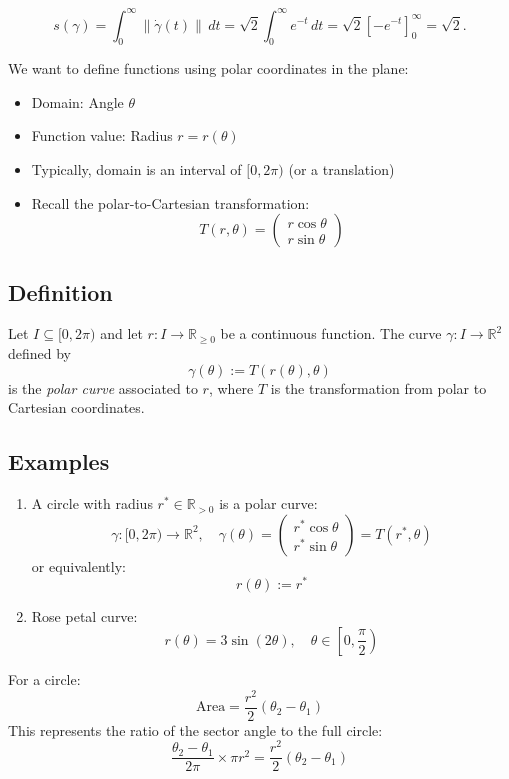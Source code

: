 \documentclass{article}
\begin{document}
\[ s(\gamma) = \int_0^\infty \|\dot{\gamma}(t)\| \, dt = \sqrt{2} \int_0^\infty e^{-t} \, dt = \sqrt{2} \left[ -e^{-t} \right]_0^\infty = \sqrt{2}. \]


We want to define functions using polar coordinates in the plane:
\begin{itemize}
    \item Domain: Angle $\theta$
    \item Function value: Radius $r = r(\theta)$
    \item Typically, domain is an interval of $[0,2\pi)$ (or a translation)
    \item Recall the polar-to-Cartesian transformation:
    \[ T(r,\theta) = \begin{pmatrix} r\cos\theta \\ r\sin\theta \end{pmatrix} \]
\end{itemize}

\subsection*{Definition}
Let $I \subseteq [0,2\pi)$ and let $r: I \rightarrow \mathbb{R}_{\geq 0}$ be a continuous function. The curve $\gamma: I \rightarrow \mathbb{R}^2$ defined by
\[ \gamma(\theta) := T(r(\theta), \theta) \]
is the \textit{polar curve} associated to $r$, where $T$ is the transformation from polar to Cartesian coordinates.

\subsection*{Examples}
\begin{enumerate}[label=(\alph*)]
    \item A circle with radius $r^* \in \mathbb{R}_{>0}$ is a polar curve:
    \[ \gamma: [0, 2\pi) \rightarrow \mathbb{R}^2, \quad \gamma(\theta) = \begin{pmatrix} r^*\cos\theta \\ r^*\sin\theta \end{pmatrix} = T(r^*, \theta) \]
    or equivalently:
    \[ r(\theta) := r^* \]
    
    \item Rose petal curve:
    \[ r(\theta) = 3\sin(2\theta), \quad \theta \in \left[0, \frac{\pi}{2}\right) \]
\end{enumerate}


For a circle:
\[ \text{Area} = \frac{r^2}{2}(\theta_2 - \theta_1) \]
This represents the ratio of the sector angle to the full circle:
\[ \frac{\theta_2 - \theta_1}{2\pi} \times \pi r^2 = \frac{r^2}{2}(\theta_2 - \theta_1) \]
\end{document}

